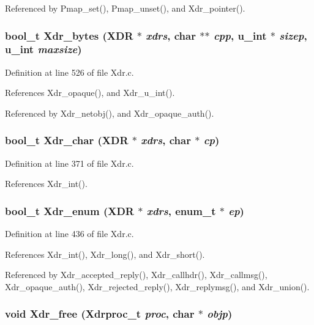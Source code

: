 Referenced by Pmap\_\-set(), Pmap\_\-unset(), and Xdr\_\-pointer().
\subsubsection{\setlength{\rightskip}{0pt plus 5cm}bool\_\-t Xdr\_\-bytes (XDR $\ast$ {\em xdrs}, char $\ast$$\ast$ {\em cpp}, u\_\-int $\ast$ {\em sizep}, u\_\-int {\em maxsize})}\label{Xdr_8c_a21}




Definition at line 526 of file Xdr.c.

References Xdr\_\-opaque(), and Xdr\_\-u\_\-int().

Referenced by Xdr\_\-netobj(), and Xdr\_\-opaque\_\-auth().
\subsubsection{\setlength{\rightskip}{0pt plus 5cm}bool\_\-t Xdr\_\-char (XDR $\ast$ {\em xdrs}, char $\ast$ {\em cp})}\label{Xdr_8c_a16}




Definition at line 371 of file Xdr.c.

References Xdr\_\-int().
\subsubsection{\setlength{\rightskip}{0pt plus 5cm}bool\_\-t Xdr\_\-enum (XDR $\ast$ {\em xdrs}, enum\_\-t $\ast$ {\em ep})}\label{Xdr_8c_a19}




Definition at line 436 of file Xdr.c.

References Xdr\_\-int(), Xdr\_\-long(), and Xdr\_\-short().

Referenced by Xdr\_\-accepted\_\-reply(), Xdr\_\-callhdr(), Xdr\_\-callmsg(), Xdr\_\-opaque\_\-auth(), Xdr\_\-rejected\_\-reply(), Xdr\_\-replymsg(), and Xdr\_\-union().
\subsubsection{\setlength{\rightskip}{0pt plus 5cm}void Xdr\_\-free (Xdrproc\_\-t {\em proc}, char $\ast$ {\em objp})}\label{Xdr_8c_a4}




